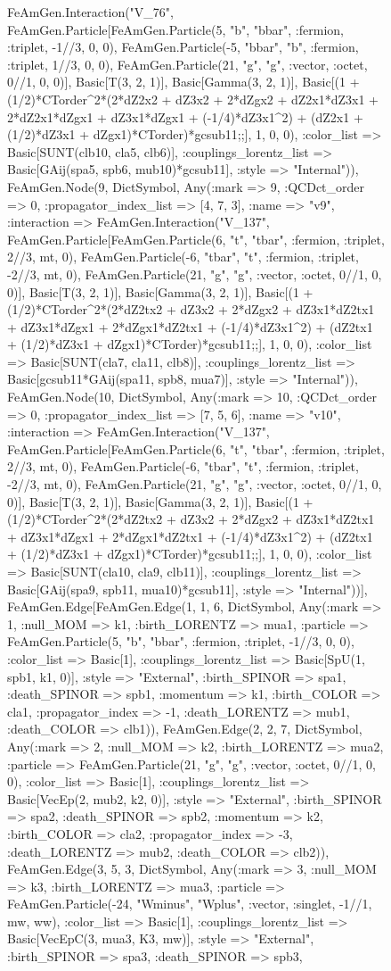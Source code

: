 \documentclass{revtex4}
\begin{document}
\begin{figure}[!htb]
\begin{center}
{FeAmGen.Interaction("V_76", FeAmGen.Particle[FeAmGen.Particle(5, "b", "bbar", :fermion, :triplet, -1//3, 0, 0), FeAmGen.Particle(-5, "bbar", "b", :fermion, :triplet, 1//3, 0, 0), FeAmGen.Particle(21, "g", "g", :vector, :octet, 0//1, 0, 0)], Basic[T(3, 2, 1)], Basic[Gamma(3, 2, 1)], Basic[(1 + (1/2)*CTorder^2*(2*dZ2x2 + dZ3x2 + 2*dZgx2 + dZ2x1*dZ3x1 + 2*dZ2x1*dZgx1 + dZ3x1*dZgx1 + (-1/4)*dZ3x1^2) + (dZ2x1 + (1/2)*dZ3x1 + dZgx1)*CTorder)*gcsub11;;], 1, 0, 0), :color_list => Basic[SUNT(clb10, cla5, clb6)], :couplings_lorentz_list => Basic[GAij(spa5, spb6, mub10)*gcsub11], :style => "Internal")), FeAmGen.Node(9, Dict{Symbol, Any}(:mark => 9, :QCDct_order => 0, :propagator_index_list => [4, 7, 3], :name => "v9", :interaction => FeAmGen.Interaction("V_137", FeAmGen.Particle[FeAmGen.Particle(6, "t", "tbar", :fermion, :triplet, 2//3, mt, 0), FeAmGen.Particle(-6, "tbar", "t", :fermion, :triplet, -2//3, mt, 0), FeAmGen.Particle(21, "g", "g", :vector, :octet, 0//1, 0, 0)], Basic[T(3, 2, 1)], Basic[Gamma(3, 2, 1)], Basic[(1 + (1/2)*CTorder^2*(2*dZ2tx2 + dZ3x2 + 2*dZgx2 + dZ3x1*dZ2tx1 + dZ3x1*dZgx1 + 2*dZgx1*dZ2tx1 + (-1/4)*dZ3x1^2) + (dZ2tx1 + (1/2)*dZ3x1 + dZgx1)*CTorder)*gcsub11;;], 1, 0, 0), :color_list => Basic[SUNT(cla7, cla11, clb8)], :couplings_lorentz_list => Basic[gcsub11*GAij(spa11, spb8, mua7)], :style => "Internal")), FeAmGen.Node(10, Dict{Symbol, Any}(:mark => 10, :QCDct_order => 0, :propagator_index_list => [7, 5, 6], :name => "v10", :interaction => FeAmGen.Interaction("V_137", FeAmGen.Particle[FeAmGen.Particle(6, "t", "tbar", :fermion, :triplet, 2//3, mt, 0), FeAmGen.Particle(-6, "tbar", "t", :fermion, :triplet, -2//3, mt, 0), FeAmGen.Particle(21, "g", "g", :vector, :octet, 0//1, 0, 0)], Basic[T(3, 2, 1)], Basic[Gamma(3, 2, 1)], Basic[(1 + (1/2)*CTorder^2*(2*dZ2tx2 + dZ3x2 + 2*dZgx2 + dZ3x1*dZ2tx1 + dZ3x1*dZgx1 + 2*dZgx1*dZ2tx1 + (-1/4)*dZ3x1^2) + (dZ2tx1 + (1/2)*dZ3x1 + dZgx1)*CTorder)*gcsub11;;], 1, 0, 0), :color_list => Basic[SUNT(cla10, cla9, clb11)], :couplings_lorentz_list => Basic[GAij(spa9, spb11, mua10)*gcsub11], :style => "Internal"))], FeAmGen.Edge[FeAmGen.Edge(1, 1, 6, Dict{Symbol, Any}(:mark => 1, :null_MOM => k1, :birth_LORENTZ => mua1, :particle => FeAmGen.Particle(5, "b", "bbar", :fermion, :triplet, -1//3, 0, 0), :color_list => Basic[1], :couplings_lorentz_list => Basic[SpU(1, spb1, k1, 0)], :style => "External", :birth_SPINOR => spa1, :death_SPINOR => spb1, :momentum => k1, :birth_COLOR => cla1, :propagator_index => -1, :death_LORENTZ => mub1, :death_COLOR => clb1)), FeAmGen.Edge(2, 2, 7, Dict{Symbol, Any}(:mark => 2, :null_MOM => k2, :birth_LORENTZ => mua2, :particle => FeAmGen.Particle(21, "g", "g", :vector, :octet, 0//1, 0, 0), :color_list => Basic[1], :couplings_lorentz_list => Basic[VecEp(2, mub2, k2, 0)], :style => "External", :birth_SPINOR => spa2, :death_SPINOR => spb2, :momentum => k2, :birth_COLOR => cla2, :propagator_index => -3, :death_LORENTZ => mub2, :death_COLOR => clb2)), FeAmGen.Edge(3, 5, 3, Dict{Symbol, Any}(:mark => 3, :null_MOM => k3, :birth_LORENTZ => mua3, :particle => FeAmGen.Particle(-24, "Wminus", "Wplus", :vector, :singlet, -1//1, mw, ww), :color_list => Basic[1], :couplings_lorentz_list => Basic[VecEpC(3, mua3, K3, mw)], :style => "External", :birth_SPINOR => spa3, :death_SPINOR => spb3, }
\end{center}
\end{figure}
\end{document}
